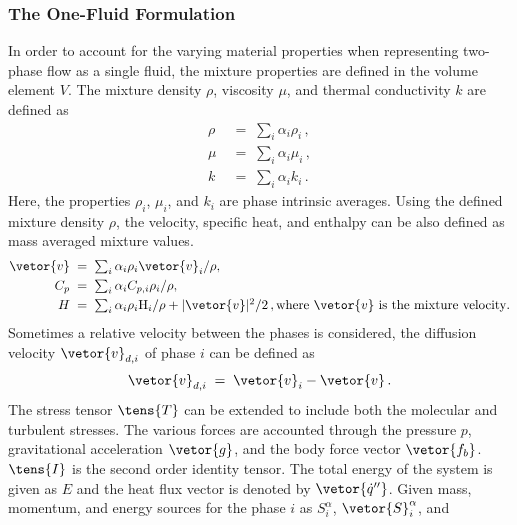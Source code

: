 \subsubsection{The One-Fluid Formulation}\label{sec:one-fluid}
In order to account for the varying material properties when representing
 two-phase flow as a single fluid, the mixture properties are defined in the 
 volume element $V$. 
 The mixture density $\rho$, viscosity $\mu$, and thermal conductivity $k$ 
 are defined as
 \begin{subequations}
  \begin{align}
    \rho &\;=\;\textstyle\sum\nolimits_{i} \alpha_{i} \rho_{i}\,,\\
    \mu &\;=\; \textstyle\sum\nolimits_{i} \alpha_{i} \mu_{i}\,,\\
    k &\;=\; \textstyle\sum\nolimits_{i} \alpha_{i} k_{i}\,.
  \end{align}
\end{subequations}
 Here, the properties $\rho_{i}$, $\mu_{i}$, and $k_{i}$ are phase intrinsic averages.
 Using the defined mixture density $\rho$, the velocity, specific heat, and enthalpy can 
 be also defined as mass averaged mixture values.
 \begin{subequations}\label{eq_vof_defs}
\begin{align}
  \vetor{v} &\;=\; \textstyle\sum\nolimits_{i} \alpha_{i} \rho_{i} \vetor{v}_{i}/ \rho,\\
  C_{p} &\;=\; \textstyle\sum\nolimits_{i} \alpha_{i} C_{p,i} \rho_{i}/\rho,\\
  H &\;=\; \textstyle\sum\nolimits_{i} \alpha_{i} \rho_{i} \mathrm{H}_{i}/\rho + |\vetor{v}|^{2}/2\,,\text{where $\vetor{v}$ is the mixture velocity}. 
\end{align}
\end{subequations}
Sometimes a relative velocity between the phases is considered, 
  the diffusion velocity $\vetor{v}_{d,i}$ of phase $i$ can be defined as
\begin{equation}
  \vetor{v}_{d,i} \;=\; \vetor{v}_{i} - \vetor{v}\,.
\end{equation}
The stress tensor $\tens{T}$ can be extended to include both the molecular and turbulent stresses. 
 The various forces are accounted through the pressure $p$, gravitational acceleration $\vetor{g}$,
 and the body force vector $\vetor{f_{b}}$. $\tens{I}$ is the second order identity tensor.
 The total energy of the system is given as 
 $E$ and the heat flux vector is denoted by $\vetor{\dot{q}''}$.  
Given mass, momentum, and energy sources for the phase $i$ as $S_{i}^{\alpha}$, $\vetor{S}_{i}^{\alpha}$, and
